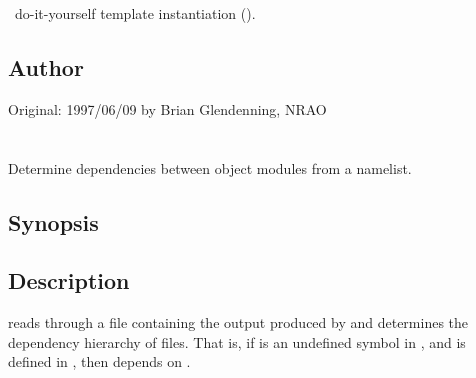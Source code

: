 \aipspp\ do-it-yourself template instantiation ().\\
 
\subsection*{Author}
 
Original: 1997/06/09 by Brian Glendenning, NRAO

 
\newpage
\section{}
\label{ldmap}
 
Determine dependencies between object modules from a namelist.

\subsection*{Synopsis}
 
\begin{synopsis}
\end{synopsis}

\subsection*{Description}
 
 reads through a file containing the output produced by
 and determines the dependency hierarchy of  files.  That
is, if  is an undefined symbol in , and  is defined
in , then  depends on .


